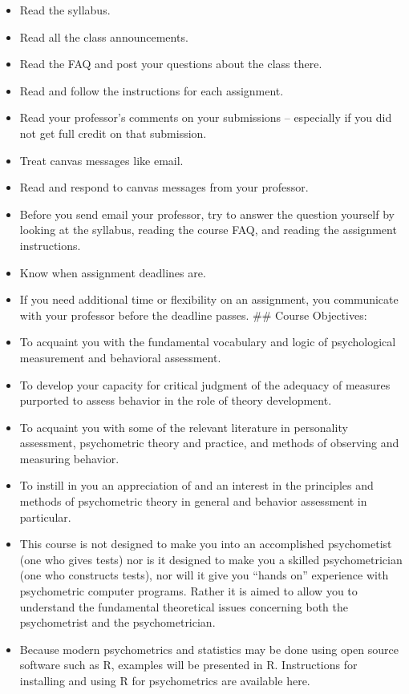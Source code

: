 \documentclass[11pt,]{article}
\providecommand{\tightlist}{%
  \setlength{\itemsep}{0pt}\setlength{\parskip}{0pt}}
\begin{document}
\begin{itemize}
\tightlist
\item
  Read the syllabus.
\item
  Read all the class announcements.
\item
  Read the FAQ and post your questions about the class there.
\item
  Read and follow the instructions for each assignment.
\item
  Read your professor's comments on your submissions -- especially if
  you did not get full credit on that submission.
\item
  Treat canvas messages like email.
\item
  Read and respond to canvas messages from your professor.
\item
  Before you send email your professor, try to answer the question
  yourself by looking at the syllabus, reading the course FAQ, and
  reading the assignment instructions.
\item
  Know when assignment deadlines are.
\item
  If you need additional time or flexibility on an assignment, you
  communicate with your professor before the deadline passes. \#\#
  Course Objectives:
\item
  To acquaint you with the fundamental vocabulary and logic of
  psychological measurement and behavioral assessment.
\item
  To develop your capacity for critical judgment of the adequacy of
  measures purported to assess behavior in the role of theory
  development.
\item
  To acquaint you with some of the relevant literature in personality
  assessment, psychometric theory and practice, and methods of observing
  and measuring behavior.
\item
  To instill in you an appreciation of and an interest in the principles
  and methods of psychometric theory in general and behavior assessment
  in particular.
\item
  This course is not designed to make you into an accomplished
  psychometist (one who gives tests) nor is it designed to make you a
  skilled psychometrician (one who constructs tests), nor will it give
  you ``hands on'' experience with psychometric computer programs.
  Rather it is aimed to allow you to understand the fundamental
  theoretical issues concerning both the psychometrist and the
  psychometrician.
\item
  Because modern psychometrics and statistics may be done using open
  source software such as R, examples will be presented in R.
  Instructions for installing and using R for psychometrics are
  available here.
\end{itemize}
\end{document}
